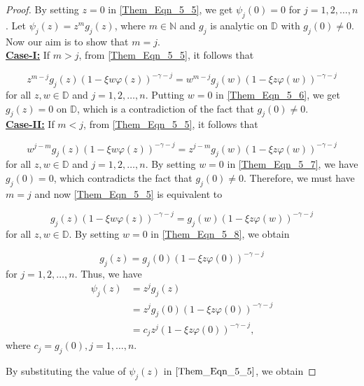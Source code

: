\documentclass[12pt, reqno]{amsart}
\theoremstyle{definition}
\theoremstyle{remark}
\numberwithin{equation}{section}
\begin{document}
\begin{proof}
By setting $z=0$ in \eqref{Them_Eqn_5_5}, we get $\psi_j(0)=0$ for  $j=1,2, \dots, n$. Let $\psi_j(z)=z^mg_j(z)$, where $m\in \mathbb{N}$ and $g_j$ is analytic on $\mathbb{D}$ with $g_j(0)\neq 0$. Now our aim is to show that $m=j$.\\

 \underline{\bf Case-I:} If $m>j$, from \eqref{Them_Eqn_5_5}, it follows that
 
\begin{equation}\label{Them_Eqn_5_6}
z^{m-j}g_j(z)(1-\xi w\varphi(z))^{-\gamma-j}=w^{m-j}g_j(w)(1-\xi z\varphi(w))^{-\gamma-j}
\end{equation}
for all $z,w\in \mathbb{D}$ and $j=1,2, \dots, n$.
Putting $w=0$ in \eqref{Them_Eqn_5_6}, we get $g_j(z)=0$ on $\mathbb{D}$, which is a contradiction of the fact that $g_j(0)\neq 0$. \\


 \underline{\bf Case-II:} If $m<j$, from \eqref{Them_Eqn_5_5}, it follows that

\begin{equation}\label{Them_Eqn_5_7}
w^{j-m}g_j(z)(1-\xi w\varphi(z))^{-\gamma-j}=z^{j-m}g_j(w)(1-\xi z\varphi(w))^{-\gamma-j}
\end{equation}
for all $z,w\in \mathbb{D}$ and $j=1,2, \dots, n$. By setting $w=0$ in \eqref{Them_Eqn_5_7}, we have $g_j(0)=0$, which contradicts the fact that $g_j(0)\neq 0$. Therefore, we must have $m=j$ and now \eqref{Them_Eqn_5_5} is equivalent to 

  \begin{equation}\label{Them_Eqn_5_8}
  g_j(z)(1-\xi w\varphi(z))^{-\gamma-j}=g_j(w)(1-\xi z\varphi(w))^{-\gamma-j}
  \end{equation}
for all $z,w\in \mathbb{D}$.
 By setting $w=0$ in \eqref{Them_Eqn_5_8}, we obtain

 \begin{equation}\label{Them_Eqn_5_9}
g_j(z)=g_j(0)(1-\xi z\varphi(0))^{-\gamma-j}
\end{equation}
for $j=1,2, \dots, n$. Thus, we have
 \begin{align*}
\psi_j(z)&=z^jg_j(z)\\
&=z^jg_j(0)(1-\xi z\varphi(0))^{-\gamma-j}\\
&=c_jz^j(1-\xi z\varphi(0))^{-\gamma-j},
\end{align*}
where $c_j=g_j(0), j=1, \dots, n$.

By substituting the value of $\psi_j(z)$ in $\eqref{Them_Eqn_5_5}$, we obtain


\end{proof}
\end{document}
